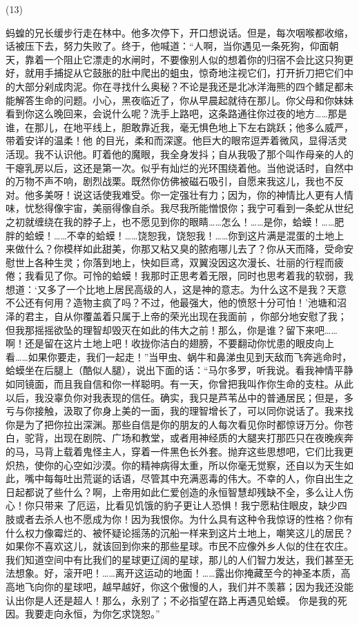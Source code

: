 \documentclass{article}
\begin{document}
(13) 

蚂蝗的兄长缓步行走在林中。他多次停下，开口想说话。但是，每次咽喉都收缩，话被压下去，努力失败了。终于，他喊道：“人啊，当你遇见一条死狗，仰面朝天，靠着一个阻止它漂走的水闸时，不要像别人似的想着你的归宿不会比这只狗更好，就用手捕捉从它鼓胀的肚中爬出的蛆虫，惊奇地注视它们，打开折刀把它们中的大部分剁成肉泥。你在寻找什么奥秘？不论是我还是北冰洋海熊的四个鳍足都未能解答生命的问题。小心，黑夜临近了，你从早晨起就待在那儿。你父母和你妹妹看到你这么晚回来，会说什么呢？洗手上路吧，这条路通往你过夜的地方……那是谁，在那儿，在地平线上，胆敢靠近我，毫无惧色地上下左右跳跃；他多么威严，带着安详的温柔！他
\newpage
的目光，柔和而深邃。他巨大的眼帘逗弄着微风，显得活灵活现。我不认识他。盯着他的魔眼，我全身发抖；自从我吸了那个叫作母亲的人的干瘪乳房以后，这还是第一次。似乎有灿烂的光环围绕着他。当他说话时，自然中的万物不声不响，剧烈战栗。既然你仿佛被磁石吸引，自愿来我这儿，我也不反对。他多美呀！说这话使我难受。你一定强壮有力；因为，你的神情比人更有人情味，忧愁得像宇宙，美丽得像自杀。我尽我所能憎恨你；我宁可看到一条蛇从世纪之初就缠绕在我的脖子上，也不愿见到你的眼睛……怎么！……是你，蛤蟆！……肥胖的蛤蟆！……不幸的蛤蟆！……饶恕我，饶恕我！……你到这片满是混蛋的土地上来做什么？你模样如此甜美，你那又粘又臭的脓疱哪儿去了？你从天而降，受命安慰世上各种生灵；你落到地上，快如巨鸢，双翼没因这次漫长、壮丽的行程而疲倦；我看见了你。可怜的蛤蟆！我那时正思考着无限，同时也思考着我的软弱，我想道：‘又多了一个比地上居民高级的人，这是神的意志。为什么这不是我？天意不公还有何用？造物主疯了吗？不过，他最强大，他的愤怒十分可怕！’池塘和沼泽的君主，自从你覆盖着只属于上帝的荣光出现在我面前
\newpage
，你部分地安慰了我；但我那摇摇欲坠的理智却毁灭在如此的伟大之前！那么，你是谁？留下来吧……啊！还是留在这片土地上吧！收拢你洁白的翅膀，不要翻动你忧患的眼皮向上看……如果你要走，我们一起走！”当甲虫、蜗牛和鼻涕虫见到天敌而飞奔逃命时，蛤蟆坐在后腿上（酷似人腿），说出下面的话：“马尔多罗，听我说。看我神情平静如同镜面，而且我自信和你一样聪明。有一天，你曾把我叫作你生命的支柱。从此以后，我没辜负你对我表现的信任。确实，我只是芦苇丛中的普通居民；但是，多亏与你接触，汲取了你身上美的一面，我的理智增长了，可以同你说话了。我来找你是为了把你拉出深渊。那些自信是你的朋友的人每次看见你时都惊讶万分。你苍白，驼背，出现在剧院、广场和教堂，或者用神经质的大腿夹打那匹只在夜晚疾奔的马，马背上载着鬼怪主人，穿着一件黑色长外套。抛弃这些思想吧，它们比我更炽热，使你的心空如沙漠。你的精神病得太重，所以你毫无觉察，还自以为天生如此，嘴中每每吐出荒诞的话语，尽管其中充满恶毒的伟大。不幸的人，你自出生之日起都说了些什么？啊，上帝用如此仁爱创造的永恒智慧却残缺不全，多么让人伤心！你只带来
\newpage
了厄运，比看见饥饿的豹子更让人恐惧！我宁愿粘住眼皮，缺少四肢或者去杀人也不愿成为你！因为我恨你。为什么具有这种令我惊讶的性格？你有什么权力像霉烂的、被怀疑论摇荡的沉船一样来到这片土地上，嘲笑这儿的居民？如果你不喜欢这儿，就该回到你来的那些星球。市民不应像外乡人似的住在农庄。我们知道空间中有比我们的星球更辽阔的星球，那儿的人们智力发达，我们甚至无法想象。好，滚开吧！……离开这运动的地面！……露出你掩藏至今的神圣本质，高高地飞向你的星球吧，越早越好，你这个傲慢的人，我们并不羡慕；因为我还没能认出你是人还是超人！那么，永别了；不必指望在路上再遇见蛤蟆。
你是我的死因。我要走向永恒，为你乞求饶恕。” 
\end{document}
